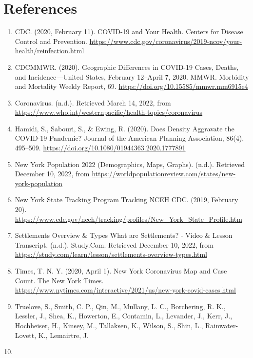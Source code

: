 \documentclass[
  12pt,
]{article}
\begin{document}
\newpage

\hypertarget{references}{%
\section{References}\label{references}}

\begin{enumerate}
\def\labelenumi{\arabic{enumi}.}
\item
  CDC. (2020, February 11). COVID-19 and Your Health. Centers for
  Disease Control and Prevention.
  \url{https://www.cdc.gov/coronavirus/2019-ncov/your-health/reinfection.html}
\item
  CDCMMWR. (2020). Geographic Differences in COVID-19 Cases, Deaths, and
  Incidence---United States, February 12--April 7, 2020. MMWR. Morbidity
  and Mortality Weekly Report, 69.
  \url{https://doi.org/10.15585/mmwr.mm6915e4}
\item
  Coronavirus. (n.d.). Retrieved March 14, 2022, from
  \url{https://www.who.int/westernpacific/health-topics/coronavirus}
\item
  Hamidi, S., Sabouri, S., \& Ewing, R. (2020). Does Density Aggravate
  the COVID-19 Pandemic? Journal of the American Planning Association,
  86(4), 495--509. \url{https://doi.org/10.1080/01944363.2020.1777891}
\item
  New York Population 2022 (Demographics, Maps, Graphs). (n.d.).
  Retrieved December 10, 2022, from
  \url{https://worldpopulationreview.com/states/new-york-population}
\item
  New York State Tracking Program \textbar{} Tracking \textbar{} NCEH
  \textbar{} CDC. (2019, February 20).
  \url{https://www.cdc.gov/nceh/tracking/profiles/New_York_State_Profile.htm}
\item
  Settlements Overview \& Types \textbar{} What are Settlements? - Video
  \& Lesson Transcript. (n.d.). Study.Com. Retrieved December 10, 2022,
  from
  \url{https://study.com/learn/lesson/settlements-overview-types.html}
\item
  Times, T. N. Y. (2020, April 1). New York Coronavirus Map and Case
  Count. The New York Times.
  \url{https://www.nytimes.com/interactive/2021/us/new-york-covid-cases.html}
\item
  Truelove, S., Smith, C. P., Qin, M., Mullany, L. C., Borchering, R.
  K., Lessler, J., Shea, K., Howerton, E., Contamin, L., Levander, J.,
  Kerr, J., Hochheiser, H., Kinsey, M., Tallaksen, K., Wilson, S., Shin,
  L., Rainwater-Lovett, K., Lemairtre, J.
\item

\end{enumerate}
\end{document}
